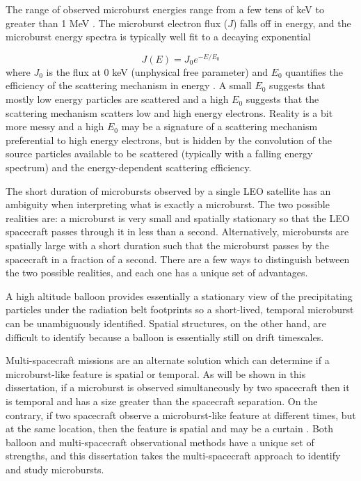 The range of observed microburst energies range from a few tens of keV \citep[e.g][]{Datta1997, Parks1967} to greater than 1 MeV \citep[e.g.][]{Blake1996, Greeley2019}. The microburst electron flux ($J$) falls off in energy, and the microburst energy spectra is typically well fit to a decaying exponential 

\begin{equation}
J(E) = J_0 e^{-E/E_0}
\end{equation} where $J_0$ is the flux at 0 keV (unphysical free parameter) and $E_0$ quantifies the efficiency of the scattering mechanism in energy \citep[.e.g][]{Parks1967, Datta1997, Lee2005}. A small $E_0$ suggests that mostly low energy particles are scattered and a high $E_0$ suggests that the scattering mechanism scatters low and high energy electrons. Reality is a bit more messy and a high $E_0$ may be a signature of a scattering mechanism preferential to high energy electrons, but is hidden by the convolution of the source particles available to be scattered (typically with a falling energy spectrum) and the energy-dependent scattering efficiency.

The short duration of microbursts observed by a single LEO satellite has an ambiguity when interpreting what is exactly a microburst. The two possible realities are: a microburst is very small and spatially stationary so that the LEO spacecraft passes through it in less than a second. Alternatively, microbursts are spatially large with a short duration such that the microburst passes by the spacecraft in a fraction of a second. There are a few ways to distinguish between the two possible realities, and each one has a unique set of advantages.

A high altitude balloon provides essentially a stationary view of the precipitating particles under the radiation belt footprints so a short-lived, temporal microburst can be unambiguously identified. Spatial structures, on the other hand, are difficult to identify because a balloon is essentially still on drift timescales.

Multi-spacecraft missions are an alternate solution which can determine if a microburst-like feature is spatial or temporal. As will be shown in this dissertation, if a microburst is observed simultaneously by two spacecraft then it is temporal and has a size greater than the spacecraft separation. On the contrary, if two spacecraft observe a microburst-like feature at different times, but at the same location, then the feature is spatial and may be a curtain \citep{Blake2016}. Both balloon and multi-spacecraft observational methods have a unique set of strengths, and this dissertation takes the multi-spacecraft approach to identify and study microbursts.


